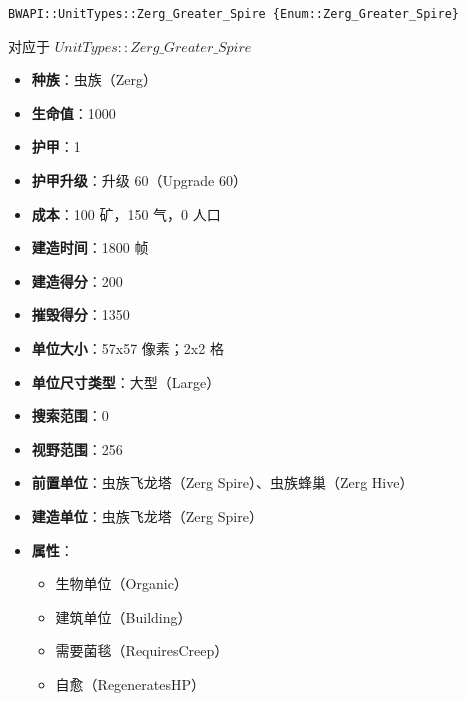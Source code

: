 \begin{tcolorbox}[colback=white, colframe=black!60!white, title=Zerg\_Greater\_Spire(), arc=0mm]
    \begin{verbatim}
BWAPI::UnitTypes::Zerg_Greater_Spire {Enum::Zerg_Greater_Spire}
    \end{verbatim}
    对应于  $UnitTypes::Zerg\_Greater\_Spire$ 
    \begin{itemize}
        \item \textbf{种族}：虫族（Zerg）
        \item \textbf{生命值}：1000
        \item \textbf{护甲}：1
        \item \textbf{护甲升级}：升级 60（Upgrade 60）
        \item \textbf{成本}：100 矿，150 气，0 人口
        \item \textbf{建造时间}：1800 帧
        \item \textbf{建造得分}：200
        \item \textbf{摧毁得分}：1350
        \item \textbf{单位大小}：57x57 像素；2x2 格
        \item \textbf{单位尺寸类型}：大型（Large）
        \item \textbf{搜索范围}：0
        \item \textbf{视野范围}：256
        \item \textbf{前置单位}：虫族飞龙塔（Zerg Spire）、虫族蜂巢（Zerg Hive）
        \item \textbf{建造单位}：虫族飞龙塔（Zerg Spire）
        \item \textbf{属性}：
            \begin{itemize}
                \item 生物单位（Organic）
                \item 建筑单位（Building）
                \item 需要菌毯（RequiresCreep）
                \item 自愈（RegeneratesHP）
            \end{itemize}
    \end{itemize}
\end{tcolorbox}

